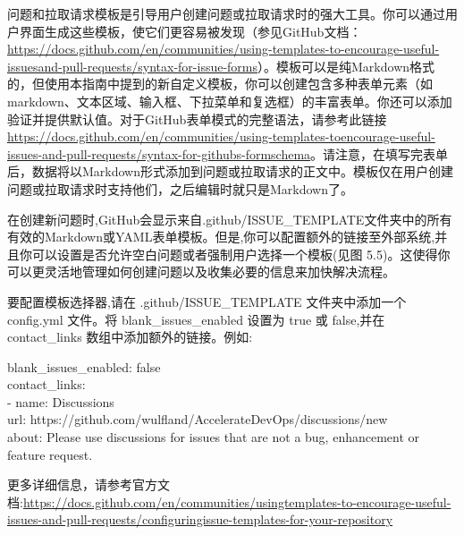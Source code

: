 
问题和拉取请求模板是引导用户创建问题或拉取请求时的强大工具。你可以通过用户界面生成这些模板，使它们更容易被发现（参见GitHub文档：\url{https://docs.github.com/en/communities/using-templates-to-encourage-useful-issuesand-pull-requests/syntax-for-issue-forms}）。模板可以是纯Markdown格式的，但使用本指南中提到的新自定义模板，你可以创建包含多种表单元素（如markdown、文本区域、输入框、下拉菜单和复选框）的丰富表单。你还可以添加验证并提供默认值。对于GitHub表单模式的完整语法，请参考此链接 \url{https://docs.github.com/en/communities/using-templates-toencourage-useful-issues-and-pull-requests/syntax-for-githubs-formschema}。请注意，在填写完表单后，数据将以Markdown形式添加到问题或拉取请求的正文中。模板仅在用户创建问题或拉取请求时支持他们，之后编辑时就只是Markdown了。


在创建新问题时,GitHub会显示来自.github/ISSUE\_TEMPLATE文件夹中的所有有效的Markdown或YAML表单模板。但是,你可以配置额外的链接至外部系统,并且你可以设置是否允许空白问题或者强制用户选择一个模板(见图 5.5)。这使得你可以更灵活地管理如何创建问题以及收集必要的信息来加快解决流程。

要配置模板选择器,请在 .github/ISSUE\_TEMPLATE 文件夹中添加一个 config.yml 文件。将 blank\_issues\_enabled 设置为 true 或 false,并在 contact\_links 数组中添加额外的链接。例如:

\begin{tcolorbox}[ breakable,colback = bashcodebg, colframe= black!50!white]
\scriptsize{
blank\_issues\_enabled: false \\
contact\_links: \\
\hspace*{1em}- name:  Discussions \\
\hspace*{2.2em}url: https://github.com/wulfland/AccelerateDevOps/discussions/new \\
\hspace*{2.2em}about: Please use discussions for issues that are not a bug, enhancement or feature request.
}
\end{tcolorbox}

更多详细信息，请参考官方文档:\url{https://docs.github.com/en/communities/usingtemplates-to-encourage-useful-issues-and-pull-requests/configuringissue-templates-for-your-repository}


